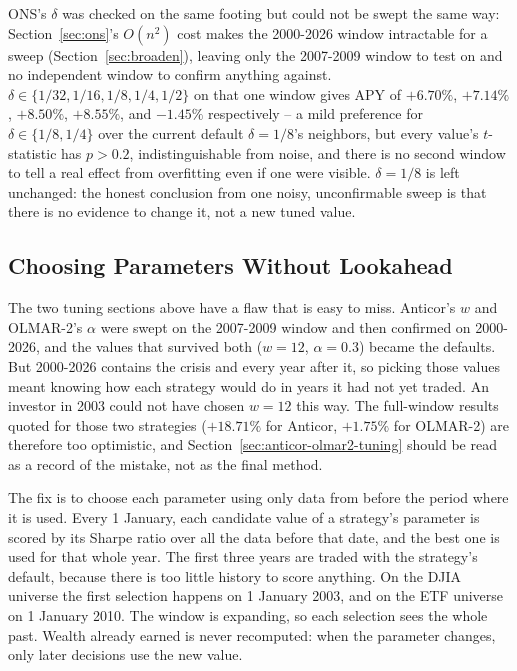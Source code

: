 \documentclass[11pt]{article}
\begin{document}
ONS's $\delta$ was checked on the same footing but could not be swept
the same way: Section~\ref{sec:ons}'s $O(n^2)$ cost makes the
2000-2026 window intractable for a sweep (Section~\ref{sec:broaden}),
leaving only the 2007-2009 window to test on and no independent window
to confirm anything against. $\delta \in \{1/32, 1/16, 1/8, 1/4, 1/2\}$
on that one window gives APY of $+6.70\%$, $+7.14\%$, $+8.50\%$,
$+8.55\%$, and $-1.45\%$ respectively -- a mild preference for
$\delta \in \{1/8, 1/4\}$ over the current default $\delta=1/8$'s
neighbors, but every value's $t$-statistic has $p > 0.2$, indistinguishable
from noise, and there is no second window to tell a real effect from
overfitting even if one were visible. $\delta=1/8$ is left unchanged:
the honest conclusion from one noisy, unconfirmable sweep is that there
is no evidence to change it, not a new tuned value.

\subsection{Choosing Parameters Without Lookahead}
\label{sec:walk-forward}

The two tuning sections above have a flaw that is easy to miss. Anticor's
$w$ and OLMAR-2's $\alpha$ were swept on the 2007-2009 window and then
confirmed on 2000-2026, and the values that survived both ($w=12$,
$\alpha=0.3$) became the defaults. But 2000-2026 contains the crisis and
every year after it, so picking those values meant knowing how each
strategy would do in years it had not yet traded. An investor in 2003
could not have chosen $w=12$ this way. The full-window results quoted for
those two strategies ($+18.71\%$ for Anticor, $+1.75\%$ for OLMAR-2) are
therefore too optimistic, and Section~\ref{sec:anticor-olmar2-tuning}
should be read as a record of the mistake, not as the final method.

The fix is to choose each parameter using only data from before the period
where it is used. Every 1 January, each candidate value of a strategy's
parameter is scored by its Sharpe ratio over all the data before that
date, and the best one is used for that whole year. The first three years
are traded with the strategy's default, because there is too little
history to score anything. On the DJIA universe the first selection
happens on 1 January 2003, and on the ETF universe on 1 January 2010. The
window is expanding, so each selection sees the whole past. Wealth
already earned is never recomputed: when the parameter changes, only later
decisions use the new value.
\end{document}
